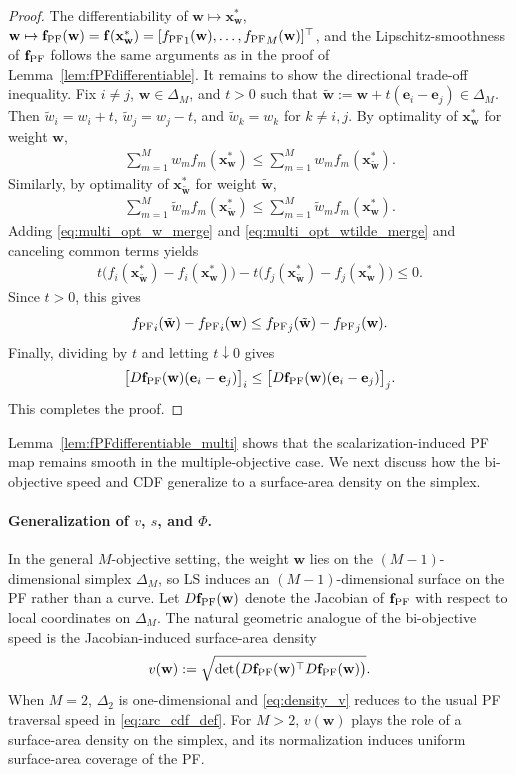 \documentclass{article}
\newcommand{\bx}{\mathbf{x}}
\newcommand{\bw}{\mathbf{w}}
\newcommand{\be}{\mathbf{e}}
\newcommand{\f}{\mathbf{f}}
\newcommand{\fPF}{{\mathbf{f}_{\rm PF}}}
\newcommand{\Farc}{\Phi}
\begin{document}
\begin{proof}
The differentiability of $\bw\mapsto \bx_\bw^*$, $\bw\mapsto \fPF(\bw)=\f(\bx_\bw^*)=[{f_{\rm PF}}_1(\bw),\dots,{f_{\rm PF}}_M(\bw)]^\top$, and the Lipschitz-smoothness of $\fPF$ follows the same arguments as in the proof of Lemma~\ref{lem:fPFdifferentiable}.
It remains to show the directional trade-off inequality. Fix $i\neq j$, $\bw\in\Delta_M$, and $t>0$ such that $\tilde{\bw}:=\bw+t(\be_i-\be_j)\in\Delta_M$. Then $\tilde w_i=w_i+t$, $\tilde w_j=w_j-t$, and $\tilde w_k=w_k$ for $k\neq i,j$. By optimality of $\bx_\bw^*$ for weight $\bw$,
\begin{align}
\sum_{m=1}^M w_m f_m(\bx_\bw^*)\le \sum_{m=1}^M w_m f_m(\bx_{\tilde{\bw}}^*). \label{eq:multi_opt_w_merge}
\end{align}
Similarly, by optimality of $\bx_{\tilde{\bw}}^*$ for weight $\tilde{\bw}$,
\begin{align}
\sum_{m=1}^M \tilde w_m f_m(\bx_{\tilde{\bw}}^*)\le \sum_{m=1}^M \tilde w_m f_m(\bx_\bw^*). \label{eq:multi_opt_wtilde_merge}
\end{align}
Adding \eqref{eq:multi_opt_w_merge} and \eqref{eq:multi_opt_wtilde_merge} and canceling common terms yields
\begin{align}
t\Big(f_i(\bx_{\tilde{\bw}}^*)-f_i(\bx_\bw^*)\Big)-t\Big(f_j(\bx_{\tilde{\bw}}^*)-f_j(\bx_\bw^*)\Big)\le 0. \label{eq:pairwise_tradeoff_sum_merge}
\end{align}
Since $t>0$, this gives
\begin{align}
{f_{\rm PF}}_i(\tilde{\bw})-{f_{\rm PF}}_i(\bw)\le {f_{\rm PF}}_j(\tilde{\bw})-{f_{\rm PF}}_j(\bw).
\end{align}
Finally, dividing by $t$ and letting $t\downarrow 0$ gives
\begin{align}
\bigl[D\fPF(\bw)(\be_i-\be_j)\bigr]_i\le \bigl[D\fPF(\bw)(\be_i-\be_j)\bigr]_j.
\end{align}
This completes the proof.
\end{proof}
Lemma~\ref{lem:fPFdifferentiable_multi} shows that the scalarization-induced PF map remains smooth in the multiple-objective case. We next discuss how the bi-objective speed and CDF generalize to a surface-area density on the simplex.
\paragraph{Generalization of $v$, $s$, and $\Farc$.}
In the general $M$-objective setting, the weight $\bw$ lies on the $(M-1)$-dimensional simplex $\Delta_M$, so LS induces an $(M-1)$-dimensional surface on the PF rather than a curve. Let $D\fPF(\bw)$ denote the Jacobian of $\fPF$ with respect to local coordinates on $\Delta_M$. The natural geometric analogue of the bi-objective speed is the Jacobian-induced surface-area density
\begin{align}
v(\bw):=\sqrt{\det\!\big(D\fPF(\bw)^\top D\fPF(\bw)\big)}. \label{eq:density_v}
\end{align}
When $M=2$, $\Delta_2$ is one-dimensional and \eqref{eq:density_v} reduces to the usual PF traversal speed in \eqref{eq:arc_cdf_def}. For $M>2$, $v(\bw)$ plays the role of a surface-area density on the simplex, and its normalization induces uniform surface-area coverage of the PF.
\end{document}
